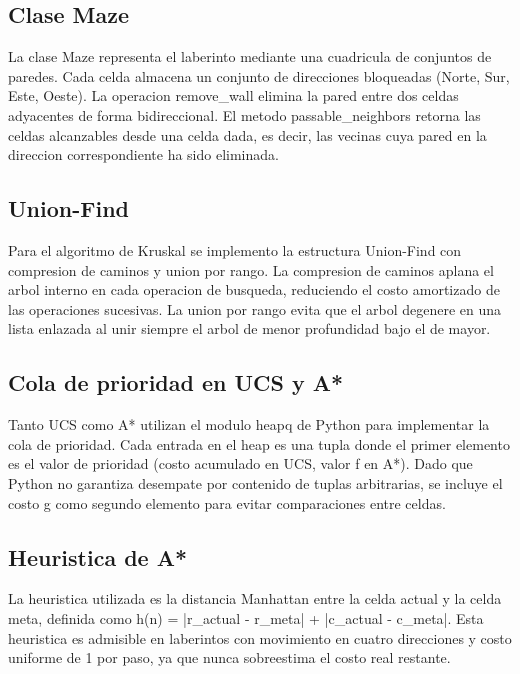 \documentclass[12pt]{article}
\begin{document}
\subsection{Clase Maze}

La clase Maze representa el laberinto mediante una cuadricula de conjuntos de paredes. Cada celda almacena un conjunto de direcciones bloqueadas (Norte, Sur, Este, Oeste). La operacion remove\_wall elimina la pared entre dos celdas adyacentes de forma bidireccional. El metodo passable\_neighbors retorna las celdas alcanzables desde una celda dada, es decir, las vecinas cuya pared en la direccion correspondiente ha sido eliminada.

\subsection{Union-Find}

Para el algoritmo de Kruskal se implemento la estructura Union-Find con compresion de caminos y union por rango. La compresion de caminos aplana el arbol interno en cada operacion de busqueda, reduciendo el costo amortizado de las operaciones sucesivas. La union por rango evita que el arbol degenere en una lista enlazada al unir siempre el arbol de menor profundidad bajo el de mayor.

\subsection{Cola de prioridad en UCS y A*}

Tanto UCS como A* utilizan el modulo heapq de Python para implementar la cola de prioridad. Cada entrada en el heap es una tupla donde el primer elemento es el valor de prioridad (costo acumulado en UCS, valor f en A*). Dado que Python no garantiza desempate por contenido de tuplas arbitrarias, se incluye el costo g como segundo elemento para evitar comparaciones entre celdas.

\subsection{Heuristica de A*}

La heuristica utilizada es la distancia Manhattan entre la celda actual y la celda meta, definida como h(n) = |r\_actual - r\_meta| + |c\_actual - c\_meta|. Esta heuristica es admisible en laberintos con movimiento en cuatro direcciones y costo uniforme de 1 por paso, ya que nunca sobreestima el costo real restante.
\end{document}

